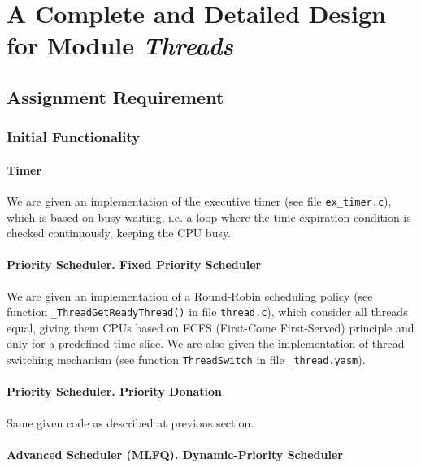 
\chapter{A Complete and Detailed Design for Module \textit{Threads}}


\section{Assignment Requirement}


\subsection{Initial Functionality}

\subsubsection{Timer}

We are given an implementation of the executive timer (see file \lstinline|ex_timer.c|), which is based on busy-waiting, i.e. a loop where the time expiration condition is checked continuously, keeping the CPU busy.

\subsubsection{Priority Scheduler. Fixed Priority Scheduler}

We are given an implementation of a Round-Robin scheduling policy (see function \lstinline|_ThreadGetReadyThread()| in file \lstinline|thread.c|), which consider all threads equal, giving them CPUs based on FCFS (First-Come First-Served) principle and only for a predefined time slice. We are also given the implementation of thread switching mechanism (see function \lstinline|ThreadSwitch| in file \lstinline|_thread.yasm|). 

\subsubsection{Priority Scheduler. Priority Donation}

Same given code as described at previous section. 

\subsubsection{Advanced Scheduler (MLFQ). Dynamic-Priority Scheduler}

